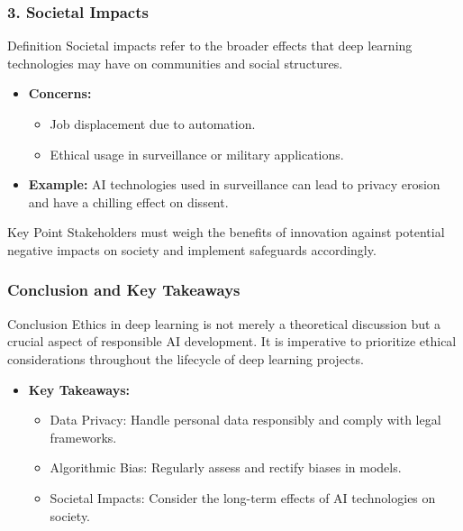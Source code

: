 \documentclass[aspectratio=169]{beamer}
\begin{document}
\begin{frame}[fragile]
    \frametitle{3. Societal Impacts}
    \begin{block}{Definition}
        Societal impacts refer to the broader effects that deep learning technologies may have on communities and social structures.
    \end{block}
    \begin{itemize}
        \item \textbf{Concerns:}
            \begin{itemize}
                \item Job displacement due to automation.
                \item Ethical usage in surveillance or military applications.
            \end{itemize}
        \item \textbf{Example:} AI technologies used in surveillance can lead to privacy erosion and have a chilling effect on dissent.
    \end{itemize}
    \begin{block}{Key Point}
        Stakeholders must weigh the benefits of innovation against potential negative impacts on society and implement safeguards accordingly.
    \end{block}
\end{frame}

\begin{frame}[fragile]
    \frametitle{Conclusion and Key Takeaways}
    \begin{block}{Conclusion}
        Ethics in deep learning is not merely a theoretical discussion but a crucial aspect of responsible AI development. It is imperative to prioritize ethical considerations throughout the lifecycle of deep learning projects.
    \end{block}
    \begin{itemize}
        \item \textbf{Key Takeaways:}
        \begin{itemize}
            \item Data Privacy: Handle personal data responsibly and comply with legal frameworks.
            \item Algorithmic Bias: Regularly assess and rectify biases in models.
            \item Societal Impacts: Consider the long-term effects of AI technologies on society.
        \end{itemize}
    \end{itemize}
\end{frame}
\end{document}

